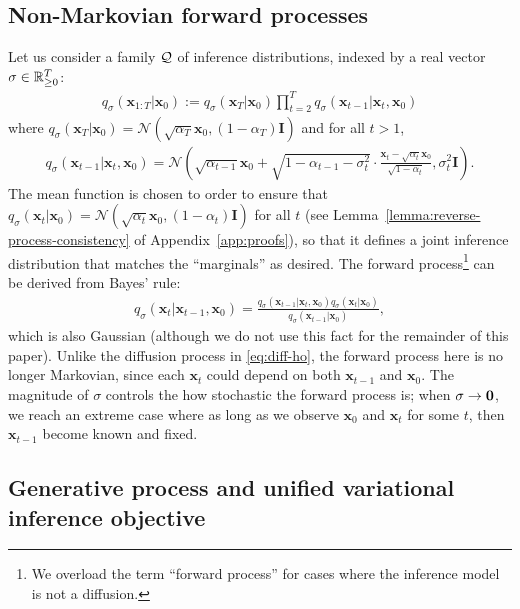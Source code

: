 \subsection{Non-Markovian forward processes} 
Let us consider a family ${\mathcal{Q}}$ of inference distributions, %
indexed by a real vector $\sigma \in \mathbb{R}_{\geq 0}^{T}$:
\begin{gather}
    q_\sigma(\bm{x}_{1:T} | \bm{x}_0) := q_\sigma(\bm{x}_T | \bm{x}_0) \prod_{t=2}^{T} q_\sigma(\bm{x}_{t-1} | \bm{x}_{t}, \bm{x}_0) \label{eq:diff-new}
\end{gather}
where $q_\sigma(\bm{x}_{T} | \bm{x}_0) = \mathcal{N}(\sqrt{\alpha_T} \bm{x}_0, (1 - \alpha_T) \bm{I})$ and for all $t > 1$,
\begin{gather} 
   q_\sigma(\bm{x}_{t-1} | \bm{x}_t, \bm{x}_0) = \mathcal{N}\left(\sqrt{\alpha_{t-1}} \bm{x}_{0} + \sqrt{1 - \alpha_{t-1} - \sigma^2_t} \cdot {\frac{\bm{x}_{t}  - \sqrt{\alpha_{t}} \bm{x}_0}{\sqrt{1 - \alpha_{t}}}}, \sigma_t^2 \bm{I} \right). \label{eq:reversed-close-form}
\end{gather}
The mean function is chosen to order to ensure that $q_\sigma(\bm{x}_{t} | \bm{x}_0) = \mathcal{N}(\sqrt{\alpha_t} \bm{x}_0, (1 - \alpha_t) \bm{I})$ for all $t$ 
(see Lemma~\ref{lemma:reverse-process-consistency} of Appendix~\ref{app:proofs}), so that it defines a joint inference distribution that matches the ``marginals'' as desired. %
The forward process\footnote{We overload the term ``forward process'' for cases where the inference model is not a diffusion.} can be derived from Bayes' rule:
\begin{align}
    q_\sigma(\bm{x}_{t} | \bm{x}_{t-1}, \bm{x}_0) = \frac{q_\sigma(\bm{x}_{t-1} | \bm{x}_{t}, \bm{x}_0) q_\sigma(\bm{x}_{t} | \bm{x}_0)}{q_\sigma(\bm{x}_{t-1} | \bm{x}_0)}, \label{eq:bayes-rule}
\end{align}
which is %
also Gaussian (although we do not use this fact for the remainder of this paper).
Unlike the diffusion process in \eqref{eq:diff-ho}, %
the forward process here is no longer Markovian, since each $\bm{x}_t$ could depend on both $\bm{x}_{t-1}$ and $\bm{x}_0$. The magnitude of $\sigma$ controls the how stochastic the forward process is; when $\sigma \to {\bm{0}}$, %
we reach an extreme case where as long as we observe $\bm{x}_0$ and $\bm{x}_t$ for some $t$, then $\bm{x}_{t-1}$ become known and fixed. %



\subsection{Generative process and unified variational inference objective}


